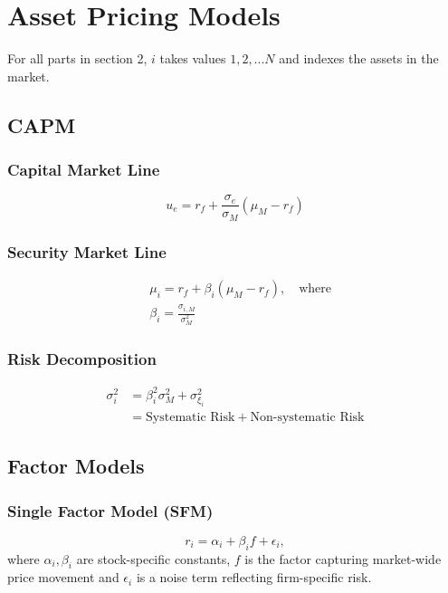 \documentclass[11pt]{article}
\begin{document}
	\section{Asset Pricing Models}
	For all parts in section 2, \( i \) takes values \( 1,2,... N \) and indexes the assets in the market.
	\subsection{CAPM}
	
	\subsubsection{Capital Market Line}
	\[	u_{e} = r_{f} + \frac{\sigma_{e}}{\sigma_{M}}(\mu_{M} - r_{f})\]
	\subsubsection{Security Market Line}
	
	\begin{align*}
	&\mu_i = r_f + \beta_i (\mu_M - r_f), \quad\text{where} \\[4pt]
	&\beta_i = \frac{\sigma_{i, M}}{\sigma_{M}^2}
	\end{align*}	
	\subsubsection{Risk Decomposition}
	\begin{align*}
		\sigma_i^2 & = \beta_i^2 \sigma_M^2 + \sigma_{\xi_{i}}^2 \\
		& = \text{Systematic Risk} + \text{Non-systematic Risk}
	\end{align*}	
	\subsection{Factor Models}
	\subsubsection{Single Factor Model (SFM)}
	\[	r_i = \alpha_i + \beta_i f + \epsilon_i, \]
	where \( \alpha_i, \beta_i \) are stock-specific constants, \( f \) is the factor capturing market-wide price movement and \( \epsilon_i \) is a noise term reflecting firm-specific risk.
\end{document}
